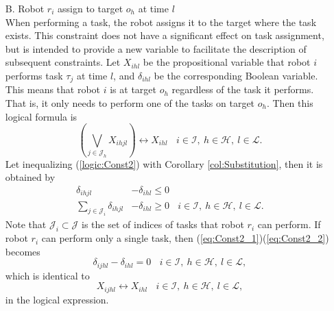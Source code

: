 \documentclass[]{interact}
\theoremstyle{plain}%
\theoremstyle{definition}
\theoremstyle{remark}
\begin{document}
\begin{itemize}
    \item[B.] Robot $r_i$ assign to target $o_h$ at time $l$\label{Const:B} \mbox{}\\
            When performing a task, the robot assigns it to the target where the task exists. 
            This constraint does not have a significant effect on task assignment, but is intended to provide a new variable to facilitate the description of subsequent constraints.
            Let $X_{ihl}$ be the propositional variable that robot $i$ performs task $\tau_j$ at time $l$, and $\delta_{ihl}$ be the corresponding Boolean variable.
            This means that robot $i$ is at target $o_h$ regardless of the task it performs. 
            That is, it only needs to perform one of the tasks on target $o_h$.
            Then this logical formula is 
            \begin{equation}\label{logic:Const2}
                \left(\bigvee_{j\in\mathcal{J}_h}X_{ihjl}\right)\leftrightarrow X_{ihl}~~~~i\in\mathcal{I},~h\in\mathcal{H},~l\in\mathcal{L}.
            \end{equation}
            Let inequalizing (\ref{logic:Const2}) with Corollary \ref{col:Substitution}, then it is obtained by
            \begin{align}
                \label{eq:Const2_1}\delta_{ihjl}&-\delta_{ihl}\le 0 \\
                \label{eq:Const2_2}\sum_{j\in\mathcal{J}_i}\delta_{ihjl}&-\delta_{ihl} \ge 0~~~~i\in\mathcal{I},~h\in\mathcal{H},~l\in\mathcal{L}.
            \end{align}
            Note that $\mathcal{J}_i\subset\mathcal{J}$ is the set of indices of tasks that robot $r_i$ can perform.
            If robot $r_i$ can perform only a single task, then (\ref{eq:Const2_1})(\ref{eq:Const2_2}) becomes 
            \begin{equation}
                \delta_{ijhl} - \delta_{ihl} = 0~~~~i\in\mathcal{I},~h\in\mathcal{H},~l\in\mathcal{L}, 
            \end{equation}
            which is identical to 
            \begin{equation}
                X_{ijhl} \leftrightarrow X_{ihl}~~~~i\in\mathcal{I},~h\in\mathcal{H},~l\in\mathcal{L},
            \end{equation}
            in the logical expression.


\end{itemize}
\end{document}

